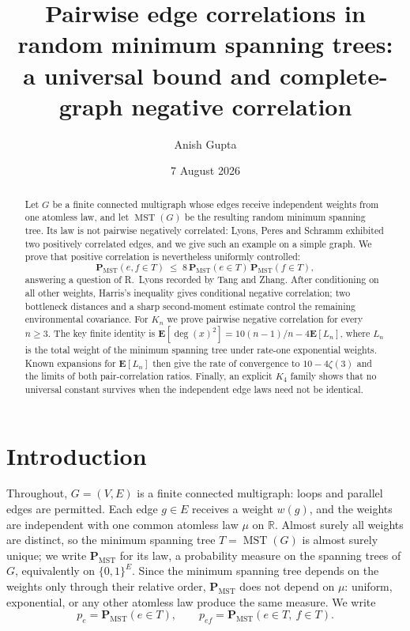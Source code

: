 \documentclass[11pt,a4paper]{amsart}
\title[Pairwise edge correlations in random minimum spanning trees]
  {Pairwise edge correlations in random minimum spanning trees:\\
  a universal bound and complete-graph negative correlation}
\author{Anish Gupta}
\date{7 August 2026}
\theoremstyle{plain}
\theoremstyle{definition}
\theoremstyle{remark}
\newcommand{\MST}{\operatorname{MST}}
\newcommand{\PMST}{\mathbf{P}_{\mathrm{MST}}}
\newcommand{\E}{\mathbf{E}}
\DeclareMathOperator{\dg}{deg}
\begin{document}
\begin{abstract}
Let $G$ be a finite connected multigraph whose edges receive independent weights
from one atomless law, and let $\MST(G)$ be the resulting random minimum
spanning tree. Its law is not pairwise negatively correlated: Lyons, Peres and
Schramm exhibited two positively correlated edges, and we give such an example
on a simple graph. We prove that positive correlation is nevertheless uniformly controlled:
\[
\PMST(e,f\in T)\;\le\;8\,\PMST(e\in T)\,\PMST(f\in T),
\]
answering a question of R.~Lyons recorded by Tang and Zhang. After conditioning
on all other weights, Harris's inequality gives conditional negative correlation; two
bottleneck distances and a sharp second-moment estimate control the remaining
environmental covariance. For $K_n$ we prove pairwise negative correlation for
every $n\ge3$. The key finite identity is
$\E[\dg(x)^2]=10(n-1)/n-4\E[L_n]$, where $L_n$ is the total weight of the
minimum spanning tree under rate-one exponential weights. Known expansions for
$\E[L_n]$ then give the rate of convergence to $10-4\zeta(3)$ and the limits of
both pair-correlation ratios. Finally, an explicit $K_4$ family shows that no
universal constant survives when the independent edge laws need not be
identical.
\end{abstract}

\maketitle

\section{Introduction}
\label{sec:intro}

Throughout, $G=(V,E)$ is a finite connected multigraph: loops and parallel edges
are permitted. Each edge $g\in E$ receives a weight $w(g)$, and the weights are
independent with one common atomless law $\mu$ on $\mathbb{R}$. Almost surely all
weights are distinct, so the minimum spanning tree $T=\MST(G)$ is almost surely
unique; we write $\PMST$ for its law, a probability measure on the spanning trees
of $G$, equivalently on $\{0,1\}^E$. Since the minimum spanning tree depends on
the weights only through their relative order, $\PMST$ does not depend on $\mu$:
uniform, exponential, or any other atomless law produce the same measure. We
write
\[
p_e=\PMST(e\in T),\qquad p_{ef}=\PMST(e\in T,\ f\in T).
\]
\end{document}

